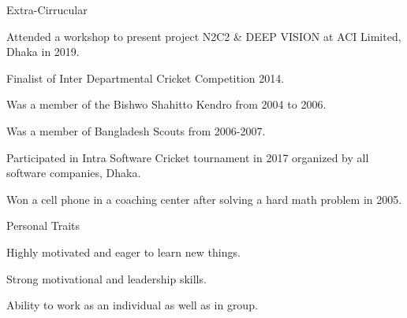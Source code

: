 \documentclass{resume} %
\begin{document}

\begin{rSection}{Extra-Cirrucular} \itemsep -3pt
\item Attended a workshop to present project N2C2 \& DEEP VISION at ACI Limited, Dhaka in 2019.
\item Finalist of Inter Departmental Cricket Competition 2014.
\item Was a member of the Bishwo Shahitto Kendro from 2004 to 2006.
\item Was a member of Bangladesh Scouts from 2006-2007.
\item  Participated in Intra Software Cricket tournament in 2017 organized by all software companies, Dhaka.
\item Won a cell phone in a coaching center after solving a hard math problem in 2005.


\end{rSection}

\begin{rSection}{Personal Traits}
\item Highly motivated and eager to learn new things.
\item Strong motivational and leadership skills.
\item Ability to work as an individual as well as in group.
\end{rSection}
\end{document}
